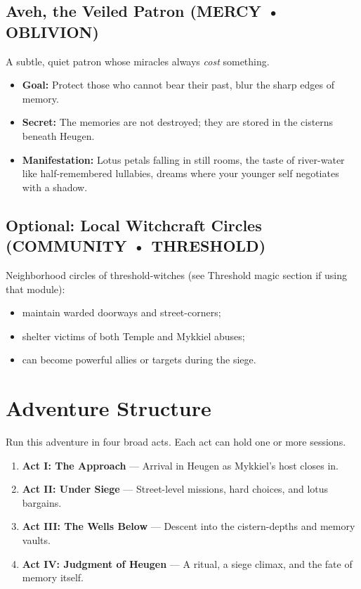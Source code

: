 \documentclass[11pt]{article}
\newcommand{\Tag}[1]{\textsc{#1}}
\begin{document}
\subsection*{Aveh, the Veiled Patron (\Tag{MERCY} • \Tag{OBLIVION})}

A subtle, quiet patron whose miracles always \emph{cost} something.

\begin{itemize}[leftmargin=*]
  \item \textbf{Goal:} Protect those who cannot bear their past, blur the sharp edges of memory.
  \item \textbf{Secret:} The memories are not destroyed; they are stored in the cisterns beneath Heugen.
  \item \textbf{Manifestation:} Lotus petals falling in still rooms, the taste of river-water like half-remembered lullabies, dreams where your younger self negotiates with a shadow.
\end{itemize}

\subsection*{Optional: Local Witchcraft Circles (\Tag{COMMUNITY} • \Tag{THRESHOLD})}

Neighborhood circles of threshold-witches (see Threshold magic section if using that module):
\begin{itemize}[leftmargin=*]
  \item maintain warded doorways and street-corners;
  \item shelter victims of both Temple and Mykkiel abuses;
  \item can become powerful allies or targets during the siege.
\end{itemize}

\section{Adventure Structure}
\label{sec:structure}

Run this adventure in four broad acts. Each act can hold one or more sessions.

\begin{enumerate}[leftmargin=*]
  \item \textbf{Act I: The Approach} --- Arrival in Heugen as Mykkiel's host closes in.
  \item \textbf{Act II: Under Siege} --- Street-level missions, hard choices, and lotus bargains.
  \item \textbf{Act III: The Wells Below} --- Descent into the cistern-depths and memory vaults.
  \item \textbf{Act IV: Judgment of Heugen} --- A ritual, a siege climax, and the fate of memory itself.
\end{enumerate}
\end{document}
